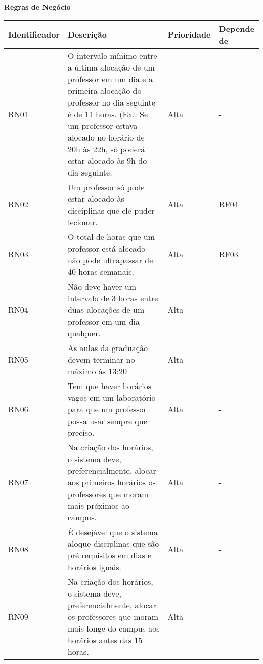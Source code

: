 \documentclass[a4paper, 12pt]{article}
\begin{document}
	\begin{landscape}
		
		\noindent \textbf{Regras de Negócio}
		
		\begin{table}[htp]
			\begin{center}
				\begin{tabular}{|p{3cm}|p{12.5cm}|p{2.5cm}|p{6cm}|}
					\hline
					\textbf{Identificador} & \textbf{Descrição} & \textbf{Prioridade} & \textbf{Depende de} \\
					\hline
					RN01 & O intervalo mínimo entre a última alocação de um professor em um dia e a primeira alocação do professor no dia seguinte é de 11 horas. (Ex.: Se um professor estava alocado no horário de 20h às 22h, só poderá estar alocado às 9h do dia seguinte. & Alta & - \\
					\hline
					RN02 & Um professor só pode estar alocado às disciplinas que ele puder lecionar. & Alta & RF04 \\
					\hline
					RN03 & O total de horas que um professor está alocado não pode ultrapassar de 40 horas semanais. & Alta & RF03 \\
					\hline
					RN04 & Não deve haver um intervalo de 3 horas entre duas alocações de um professor em um dia qualquer. & Alta & - \\
					\hline
					RN05 & As aulas da graduação devem terminar no máximo às 13:20 & Alta & - \\
					\hline
					RN06 & Tem que haver horários vagos em um laboratório para que um professor possa usar sempre que preciso. & Alta & - \\
					\hline
					RN07 & Na criação dos horários, o sistema deve, preferencialmente, alocar aos primeiros horários os professores que moram mais próximos ao campus. & Alta & - \\
					\hline
					RN08 & É desejável que o sistema aloque disciplinas que são pré requisitos em dias e horários iguais. & Alta & - \\
					\hline
					RN09 & Na criação dos horários, o sistema deve, preferencialmente, alocar os professores que moram mais longe do campus aos horários antes das 15 horas. & Alta & - \\
					\hline
					
				\end{tabular}
			\end{center}
		\end{table}
	\end{landscape}
	
	
	
	
\end{document}
